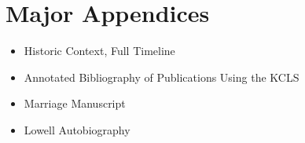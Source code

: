 \documentclass[a4paper,man,natbib,12pt,apacite]{apa6}\usepackage[]{graphicx}\usepackage[]{color}
\newlength{\wideitemsep}
\let\olditem\item
\renewcommand{\item}{\setlength{\itemsep}{\wideitemsep}\olditem}
\begin{document}
\section{Major Appendices}
\begin{itemize}
\item Historic Context, Full Timeline
\item Annotated Bibliography of Publications Using the KCLS
\item Marriage Manuscript
\item Lowell Autobiography
\end{itemize}
\pagebreak\label{bibliography}
\appendix\label{appen}\pagebreak{}
%








\end{document}

